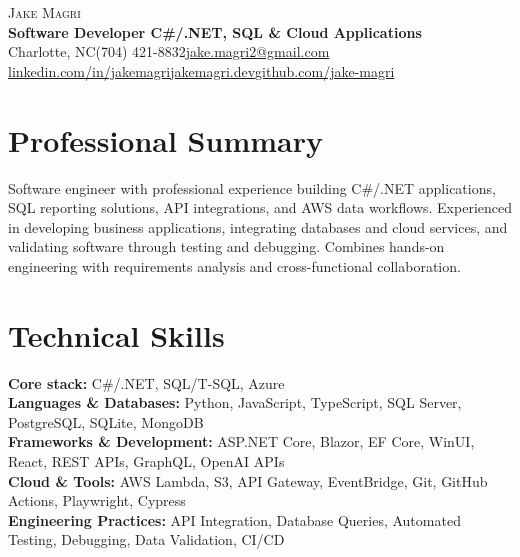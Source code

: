 \documentclass[letterpaper,11pt]{article}
\begin{document}
\begin{center}
{\Huge\scshape Jake Magri}\\[2pt]
\textbf{Software Developer \textbar{} C\#/.NET, SQL \& Cloud Applications}\\[3pt]
\small Charlotte, NC\enspace\textbar{}\enspace(704) 421-8832\enspace\textbar{}\enspace\href{mailto:jake.magri2@gmail.com}{jake.magri2@gmail.com}\\
\href{https://www.linkedin.com/in/jakemagri/}{linkedin.com/in/jakemagri}\enspace\textbar{}\enspace\href{https://jakemagri.dev}{jakemagri.dev}\enspace\textbar{}\enspace\href{https://github.com/jake-magri}{github.com/jake-magri}
\end{center}\vspace{-9pt}
\small
\section{Professional Summary}
Software engineer with professional experience building C\#/.NET applications, SQL reporting solutions, API integrations, and AWS data workflows. Experienced in developing business applications, integrating databases and cloud services, and validating software through testing and debugging. Combines hands-on engineering with requirements analysis and cross-functional collaboration.

\section{Technical Skills}
\textbf{Core stack:} C\#/.NET, SQL/T-SQL, Azure\\
\textbf{Languages \& Databases:} Python, JavaScript, TypeScript, SQL Server, PostgreSQL, SQLite, MongoDB\\
\textbf{Frameworks \& Development:} ASP.NET Core, Blazor, EF Core, WinUI, React, REST APIs, GraphQL, OpenAI APIs\\
\textbf{Cloud \& Tools:} AWS Lambda, S3, API Gateway, EventBridge, Git, GitHub Actions, Playwright, Cypress\\
\textbf{Engineering Practices:} API Integration, Database Queries, Automated Testing, Debugging, Data Validation, CI/CD
\end{document}
